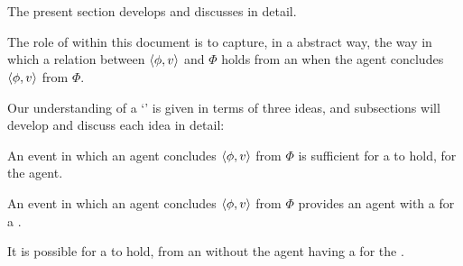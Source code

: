 \chapter{}
\label{cha:ros}

\begin{note}
  The present section develops and discusses  in detail.

  The role of  within this document is to capture, in a abstract way, the way in which a relation between \(\langle \phi, v \rangle\) and \(\Phi\) holds from an \agpe{} when the agent concludes \(\langle \phi, v \rangle\) from \(\Phi\).
\end{note}

\begin{note}
  Our understanding of a `' is given in terms of three ideas, and subsections will develop and discuss each idea in detail:

  \begin{TOCEnum}
  \item

    An event in which an agent concludes \(\langle \phi, v \rangle\) from \(\Phi\) is sufficient for a \ros{} to hold, for the agent.
  \item

    An event in which an agent concludes \(\langle \phi, v \rangle\) from \(\Phi\) provides an agent with a  for a \ros{}.
  \item

    It is possible for a \ros{} to hold, from an \agpe{} without the agent having a \wit{} for the \ros{}.
  \end{TOCEnum}
\end{note}

\section{\supportI{}}
\label{cha:ros:I}

